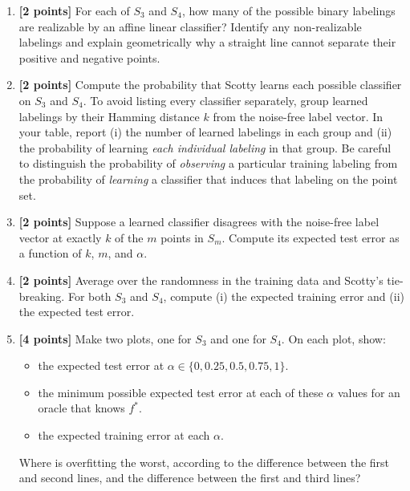 \begin{enumerate}
\renewcommand{\labelenumi}{\textbf{(\alph{enumi})}}
\setlength{\itemsep}{1.5em}

\item {\bf [2 points]}
For each of $S_3$ and $S_4$, how many of the possible binary labelings are
realizable by an affine linear classifier?  Identify any non-realizable
labelings and explain geometrically why a straight line cannot separate their
positive and negative points.
\begin{tcolorbox}[height=4cm, width=\linewidth]

\end{tcolorbox}

\item {\bf [2 points]}
Compute the probability that Scotty learns each possible classifier on $S_3$
and $S_4$.  To avoid listing every classifier separately, group learned
labelings by their Hamming distance $k$ from the noise-free label vector.  In
your table, report (i) the number of learned labelings in each group and (ii)
the probability of learning \emph{each individual labeling} in that group.
Be careful to distinguish the probability of \emph{observing} a particular
training labeling from the probability of \emph{learning} a classifier that
induces that labeling on the point set.
\begin{tcolorbox}[height=7cm, width=\linewidth]

\end{tcolorbox}

\item {\bf [2 points]}
Suppose a learned classifier disagrees with the noise-free label vector at
exactly $k$ of the $m$ points in $S_m$.  Compute its expected test error as a
function of $k$, $m$, and $\alpha$.
\begin{tcolorbox}[height=4cm, width=\linewidth]

\end{tcolorbox}


\item {\bf [2 points]}
Average over the randomness in the training data and Scotty's tie-breaking.
For both $S_3$ and $S_4$, compute (i) the expected training error and (ii) the
expected test error.
\begin{tcolorbox}[height=5cm, width=\linewidth]

\end{tcolorbox}

\item {\bf [4 points]}
Make two plots, one for $S_3$ and one for $S_4$. On each plot, show:
\begin{itemize}
    \item the expected test error at $\alpha\in\{0,0.25,0.5,0.75,1\}$.
    \item the minimum possible expected test error at each of these $\alpha$ values for an oracle that knows $f^*$. 
    \item the expected training error at each $\alpha$.
\end{itemize}
Where is overfitting the worst, according to the difference between the first and second lines, and the difference between the first and third lines?


\end{enumerate}
